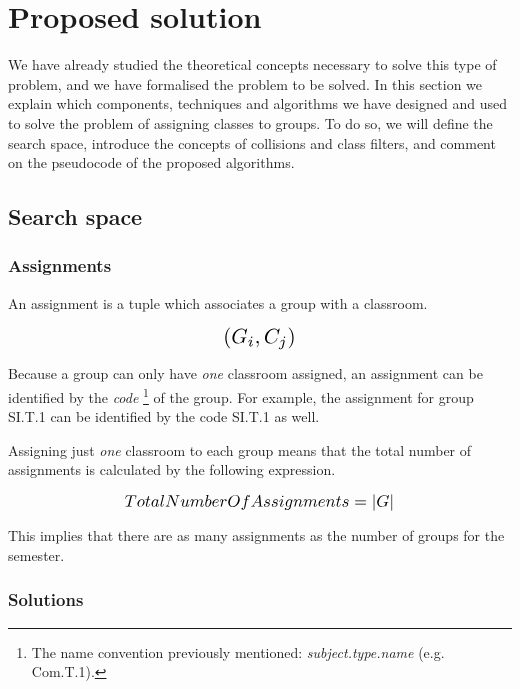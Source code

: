 \renewcommand{\documentname}{Proposed solution}

\chapter{Proposed solution}

We have already studied the theoretical concepts necessary to solve this type of problem, and we have formalised the problem to be solved. In this section we explain which components, techniques and algorithms we have designed and used to solve the problem of assigning classes to groups. To do so, we will define the search space, introduce the concepts of collisions and class filters, and comment on the pseudocode of the proposed algorithms.



\section{Search space}


\subsection{Assignments}

An assignment is a tuple which associates a group with a classroom.

\begin{equation}
    \scalebox{1.5}{$(G_{i}, C_{j})$}
\end{equation}

Because a group can only have \textit{one} classroom assigned, an assignment can be identified by the \textit{code} \footnote{The name convention previously mentioned: \textit{subject.type.name} (e.g. Com.T.1).} of the group. For example, the assignment for group SI.T.1 can be identified by the code SI.T.1 as well.

Assigning just \textit{one} classroom to each group means that the total number of assignments is calculated by the following expression.

\begin{equation}
    \scalebox{1.2}{$TotalNumberOfAssignments = \left|G\right|$}
\end{equation}

This implies that there are as many assignments as the number of groups for the semester.

\subsection{Solutions}

